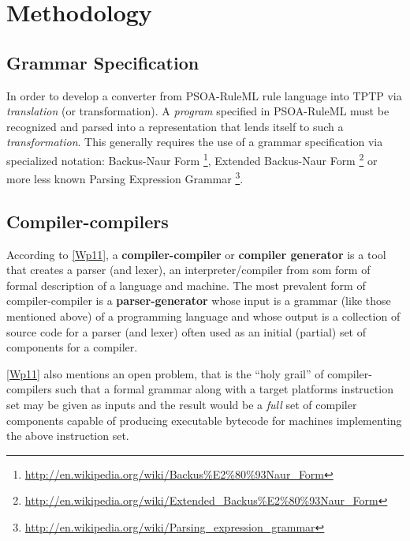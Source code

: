 \documentclass[letterpaper,10pt,english]{sphinxmanual}
\begin{document}
\section{Methodology}
\label{project-proposal/index:methodology}\label{project-proposal/index:index-0}

\subsection{Grammar Specification}
\label{project-proposal/index:grammar-specification}
In order to develop a converter from PSOA-RuleML rule language into TPTP via
\emph{translation} (or transformation).  A \emph{program} specified in PSOA-RuleML must be
recognized and parsed into a representation that lends itself to such a
\emph{transformation}.  This generally requires the use of a grammar specification
via specialized notation: Backus-Naur Form \footnote{
\href{http://en.wikipedia.org/wiki/Backus\%E2\%80\%93Naur\_Form}{http://en.wikipedia.org/wiki/Backus\%E2\%80\%93Naur\_Form}
}, Extended Backus-Naur Form \footnote{
\href{http://en.wikipedia.org/wiki/Extended\_Backus\%E2\%80\%93Naur\_Form}{http://en.wikipedia.org/wiki/Extended\_Backus\%E2\%80\%93Naur\_Form}
} or
more less known Parsing Expression Grammar \footnote{
\href{http://en.wikipedia.org/wiki/Parsing\_expression\_grammar}{http://en.wikipedia.org/wiki/Parsing\_expression\_grammar}
}.


\subsection{Compiler-compilers}
\label{project-proposal/index:compiler-compilers}
According to {\hyperref[project-proposal/index:wp11]{{[}Wp11{]}}}, a \textbf{compiler-compiler} or \textbf{compiler generator} is a
tool that creates a parser (and lexer), an interpreter/compiler from som form of
formal description of a language and machine.  The most prevalent form of
compiler-compiler is a \textbf{parser-generator} whose input is a grammar (like those
mentioned above) of a programming language and whose output is a collection of
source code for a parser (and lexer) often used as an initial (partial) set of components
for a compiler.

{\hyperref[project-proposal/index:wp11]{{[}Wp11{]}}} also mentions an open problem, that is the ``holy grail'' of
compiler-compilers such that a formal grammar along with a target platforms
instruction set may be given as inputs and the result would be a \emph{full} set of
compiler components capable of producing executable bytecode for machines
implementing the above instruction set.
\end{document}
